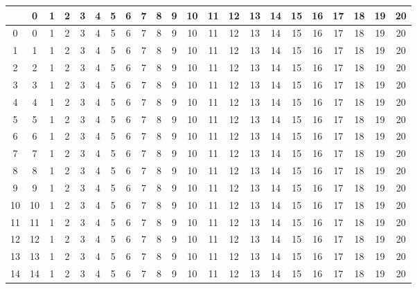 \documentclass[10pt]{article}
\begin{document}
\begin{table}[ht]
  \centering
  \begin{tabular}{c|ccc|ccc|ccc|ccc|ccc|ccc|ccc}
    \hline
      & 0 & 1 & 2 & 3 & 4 & 5 & 6 & 7 & 8 & 9 & 10 & 11 & 12 & 13 & 14 & 15 & 16 & 17 & 18 & 19 & 20\\\hline

    \rowcolor{LightCyan}
    0 & 0 & 1 & 2 & 3 & 4 & 5 & 6 & 7 & 8 & 9 & 10 & 11 & 12 & 13 & 14 & 15 & 16 & 17 & 18 & 19 & 20\\
    \rowcolor{LightCyan}
    1 & 1 & 1 & 2 & 3 & 4 & 5 & 6 & 7 & 8 & 9 & 10 & 11 & 12 & 13 & 14 & 15 & 16 & 17 & 18 & 19 & 20\\
    \rowcolor{LightCyan}
    2 & 2 & 1 & 2 & 3 & 4 & 5 & 6 & 7 & 8 & 9 & 10 & 11 & 12 & 13 & 14 & 15 & 16 & 17 & 18 & 19 & 20\\

    3 & 3 & 1 & 2 & 3 & 4 & 5 & 6 & 7 & 8 & 9 & 10 & 11 & 12 & 13 & 14 & 15 & 16 & 17 & 18 & 19 & 20\\
    4 & 4 & 1 & 2 & 3 & 4 & 5 & 6 & 7 & 8 & 9 & 10 & 11 & 12 & 13 & 14 & 15 & 16 & 17 & 18 & 19 & 20\\
    5 & 5 & 1 & 2 & 3 & 4 & 5 & 6 & 7 & 8 & 9 & 10 & 11 & 12 & 13 & 14 & 15 & 16 & 17 & 18 & 19 & 20\\

    \rowcolor{LightCyan}
    6 & 6 & 1 & 2 & 3 & 4 & 5 & 6 & 7 & 8 & 9 & 10 & 11 & 12 & 13 & 14 & 15 & 16 & 17 & 18 & 19 & 20\\
    \rowcolor{LightCyan}
    7 & 7 & 1 & 2 & 3 & 4 & 5 & 6 & 7 & 8 & 9 & 10 & 11 & 12 & 13 & 14 & 15 & 16 & 17 & 18 & 19 & 20\\
    \rowcolor{LightCyan}
    8 & 8 & 1 & 2 & 3 & 4 & 5 & 6 & 7 & 8 & 9 & 10 & 11 & 12 & 13 & 14 & 15 & 16 & 17 & 18 & 19 & 20\\

    9 & 9 & 1 & 2 & 3 & 4 & 5 & 6 & 7 & 8 & 9 & 10 & 11 & 12 & 13 & 14 & 15 & 16 & 17 & 18 & 19 & 20\\
    10 & 10 & 1 & 2 & 3 & 4 & 5 & 6 & 7 & 8 & 9 & 10 & 11 & 12 & 13 & 14 & 15 & 16 & 17 & 18 & 19 & 20\\
    11 & 11 & 1 & 2 & 3 & 4 & 5 & 6 & 7 & 8 & 9 & 10 & 11 & 12 & 13 & 14 & 15 & 16 & 17 & 18 & 19 & 20\\

    \rowcolor{LightCyan}
    12 & 12 & 1 & 2 & 3 & 4 & 5 & 6 & 7 & 8 & 9 & 10 & 11 & 12 & 13 & 14 & 15 & 16 & 17 & 18 & 19 & 20\\
    \rowcolor{LightCyan}
    13 & 13 & 1 & 2 & 3 & 4 & 5 & 6 & 7 & 8 & 9 & 10 & 11 & 12 & 13 & 14 & 15 & 16 & 17 & 18 & 19 & 20\\
    \rowcolor{LightCyan}
    14 & 14 & 1 & 2 & 3 & 4 & 5 & 6 & 7 & 8 & 9 & 10 & 11 & 12 & 13 & 14 & 15 & 16 & 17 & 18 & 19 & 20\\


\end{tabular}
\end{table}
\end{document}
